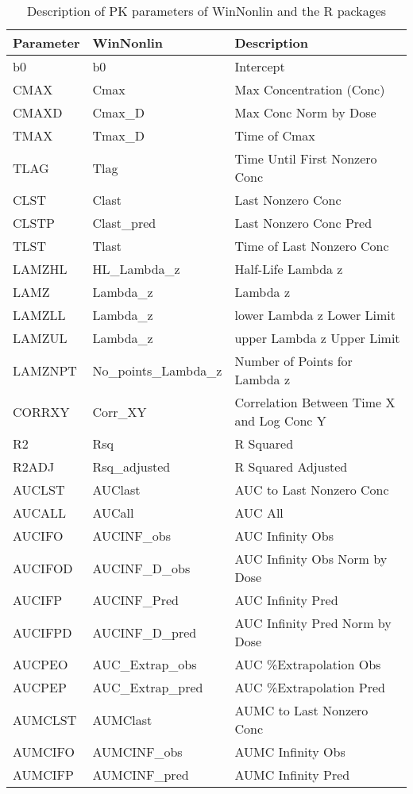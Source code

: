 \documentclass[12pt,]{krantz}
\theoremstyle{definition}
\theoremstyle{definition}
\theoremstyle{definition}
\theoremstyle{remark}
\begin{document}
\begin{longtable}[t]{lll}
\caption{\label{tab:table1}Description of PK parameters of WinNonlin and the R packages}\\
\toprule
Parameter & WinNonlin & Description\\
\midrule
b0 & b0 & Intercept\\
CMAX & Cmax & Max Concentration (Conc)\\
CMAXD & Cmax\_D & Max Conc Norm by Dose\\
TMAX & Tmax\_D & Time of Cmax\\
TLAG & Tlag & Time Until First Nonzero Conc\\
\addlinespace
CLST & Clast & Last Nonzero Conc\\
CLSTP & Clast\_pred & Last Nonzero Conc Pred\\
TLST & Tlast & Time of Last Nonzero Conc\\
LAMZHL & HL\_Lambda\_z & Half-Life Lambda z\\
LAMZ & Lambda\_z & Lambda z\\
\addlinespace
LAMZLL & Lambda\_z & lower Lambda z Lower Limit\\
LAMZUL & Lambda\_z & upper Lambda z Upper Limit\\
LAMZNPT & No\_points\_Lambda\_z & Number of Points for Lambda z\\
CORRXY & Corr\_XY & Correlation Between Time X and Log Conc Y\\
R2 & Rsq & R Squared\\
\addlinespace
R2ADJ & Rsq\_adjusted & R Squared Adjusted\\
AUCLST & AUClast & AUC to Last Nonzero Conc\\
AUCALL & AUCall & AUC All\\
AUCIFO & AUCINF\_obs & AUC Infinity Obs\\
AUCIFOD & AUCINF\_D\_obs & AUC Infinity Obs Norm by Dose\\
\addlinespace
AUCIFP & AUCINF\_Pred & AUC Infinity Pred\\
AUCIFPD & AUCINF\_D\_pred & AUC Infinity Pred Norm by Dose\\
AUCPEO & AUC\_Extrap\_obs & AUC \%Extrapolation Obs\\
AUCPEP & AUC\_Extrap\_pred & AUC \%Extrapolation Pred\\
AUMCLST & AUMClast & AUMC to Last Nonzero Conc\\
\addlinespace
AUMCIFO & AUMCINF\_obs & AUMC Infinity Obs\\
AUMCIFP & AUMCINF\_pred & AUMC Infinity Pred\\

\end{longtable}
\end{document}

